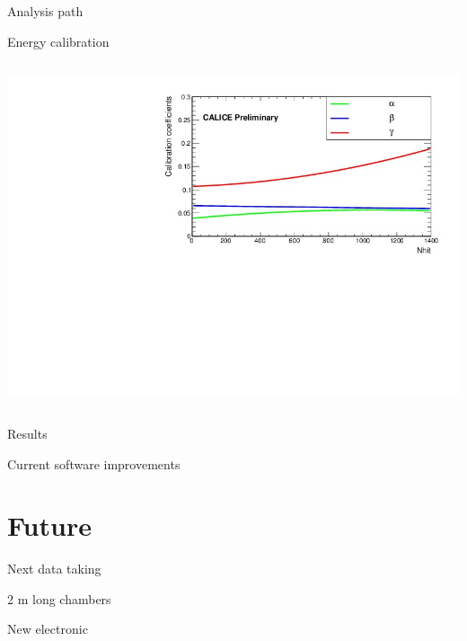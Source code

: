 \documentclass[10pt]{beamer}
\begin{document}
\begin{frame}{Analysis path}
\begin{block}{Energy calibration}
\begin{columns}[t]
\begin{column}{0.5\textwidth}
  \centerline{\includegraphics[height=0.45\textheight]{jpg/evolution.jpg}}

\end{column}
\end{columns}
\end{block}
\end{frame}
\begin{frame}{Results}
\end{frame}

\begin{frame}{Current software improvements}
\end{frame}

\section{Future}

\begin{frame}{Next data taking}
\end{frame}

\begin{frame}{2 m long chambers}
\end{frame}

\begin{frame}{ New electronic}
\end{frame}
\end{document}
